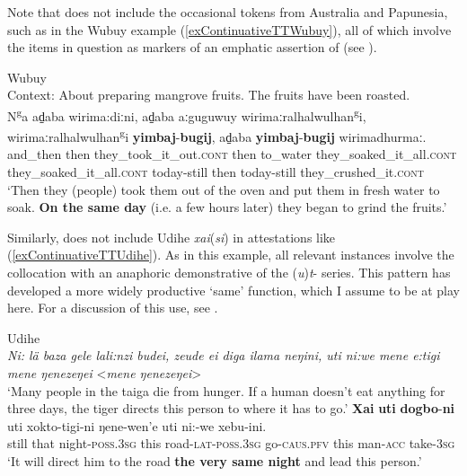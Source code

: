 Note that  does not include the occasional tokens from Australia and Papunesia, such as in the Wubuy example (\ref{exContinuativeTTWubuy}), all of which involve the items in question as markers of an emphatic assertion of  (see ).

\begin{exe}
	\ex Wubuy\\
 Context: About preparing mangrove fruits. The fruits have been roasted.\label{exContinuativeTTWubuy}\\
	\gll N\textsuperscript{g}a ad̠aba wirima:diːni, ad̠aba aːguguwuy wirimaːralhalwulhan\textsuperscript{g}i, wirimaːralhalwulhan\textsuperscript{g}i \textbf{yimbaj}-\textbf{bugij}, ad̠aba \textbf{yimbaj}-\textbf{bugij} wirimadhurmaː.\\
and\_then then they\_took\_it\_out.\textsc{cont} then to\_water they\_soaked\_it\_all.\textsc{cont} they\_soaked\_it\_all.\textsc{cont} today-still then today-still they\_crushed\_it.\textsc{cont}\\
	\glt \lq Then they (people) took them out of the oven and put them in fresh water to soak. \textbf{On the same day} (i.e. a few hours later) they began to grind the fruits.' \parencite[423]{Heath1980}
\end{exe}

Similarly,  does not include Udihe \mbox{\textit{xai}(\textit{si})} in attestations like (\ref{exContinuativeTTUdihe}). As in this example, all relevant instances involve the collocation with an anaphoric demonstrative of the \mbox{(\textit{u})\textit{t}-} series. This pattern has developed a more widely productive \lq same\rq{ }function, which I assume to be at play here. For a discussion of this use, see  .

\begin{exe}
	\ex Udihe\label{exContinuativeTTUdihe}\\
	\textit{Ni: lä baza gele lali:nzi budei, zeude ei diga ilama neŋini, uti ni:we mene e:tigi mene ŋenezeŋei} <\textit{mene ŋenezeŋei}>\\
	\lq Many people in the taiga die from hunger. If a human doesn’t eat anything for three days, the tiger directs this person to where it has to go.'
	\exi{}
	\gll \textbf{Xai} \textbf{uti} \textbf{dogbo}-\textbf{ni} uti xokto-tigi-ni ŋene-wen’e uti ni:-we xebu-ini.\\
still that night-\textsc{poss}.3\textsc{sg} this road-\textsc{lat}-\textsc{poss}.3\textsc{sg} go-\textsc{caus}.\textsc{pfv} this man-\textsc{acc} take-3\textsc{sg}\\
\glt \lq It will direct him to the road \textbf{the very same night} and lead this person.' \parencite[The tiger for Udihe people]{NikolaevaEtAl2019}
\end{exe}

